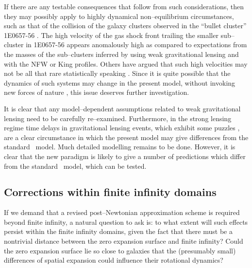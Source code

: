 \documentclass[12pt]{iopart}
\begin{document}
If there are any testable consequences that follow from such considerations,
then they may possibly apply to highly dynamical non--equilibrium
circumstances, such as that of the collision of the galaxy clusters observed
in the ``bullet cluster'' 1E0657-56 \cite{bullet1}. The high velocity of the
gas shock front trailing the smaller sub--cluster in 1E0657-56 appears
anomalously high \cite{bullet2} as compared to expectations from the
masses of the sub--clusters inferred by using weak gravitational lensing
and with the NFW or King \cite{King} profiles. Others have argued
that such high velocities may not be all that rare statistically
speaking \cite{Hayashi}. Since it is quite possible that the dynamics
of such systems may change in the present model, without invoking new
forces of nature \cite{bullet2}, this issue deserves further investigation.

It is clear that any model--dependent assumptions related to weak
gravitational lensing need to be carefully re--examined. Furthermore,
in the strong lensing regime time delays
in gravitational lensing events, which exhibit some puzzles
\cite{Kochanek}, are a clear circumstance in which the present model
may give differences from the standard \LCDM\ model. Much detailed
modelling remains to be done. However, it is clear that the new
paradigm is likely to give a number of predictions which differ from the
standard \LCDM\ model, which can be tested.

\subsection{Corrections within finite infinity domains\label{fid}}

If we demand that a revised post--Newtonian approximation scheme is required
beyond finite infinity, a natural question to ask is: to what extent
will such effects persist within the finite infinity domains, given the
fact that there must be a nontrivial distance between the zero expansion
surface and finite infinity? Could the zero expansion surface lie so
close to galaxies that the (presumably small) differences of spatial
expansion could influence their rotational dynamics?
\end{document}
